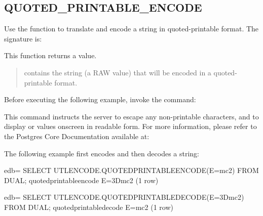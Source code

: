 \documentclass[letterpaper,10pt,english,openany,oneside]{sphinxmanual}
\begin{document}
\newpage


\subsection{QUOTED\_PRINTABLE\_ENCODE}
\label{\detokenize{quoted_printable_encode::doc}}\label{\detokenize{quoted_printable_encode:quoted-printable-encode}}
Use the  function to translate and encode a
string in quoted-printable format. The signature is:
\begin{quote}

\end{quote}

This function returns a  value.


\begin{quote}

 contains the string (a RAW value) that will be encoded in a
quoted-printable format.
\end{quote}


Before executing the following example, invoke the command:
\begin{quote}

\end{quote}

This command instructs the server to escape any non-printable
characters, and to display  or  values onscreen in readable
form. For more information, please refer to the Postgres Core
Documentation available at:


The following example first encodes and then decodes a string:

%
\begin{sphinxVerbatim}[commandchars=\\\{\}]
edb=\PYGZsh{} SELECT UTL\PYGZus{}ENCODE.QUOTED\PYGZus{}PRINTABLE\PYGZus{}ENCODE(\PYGZsq{}E=mc2\PYGZsq{}) FROM DUAL;  quoted\PYGZus{}printable\PYGZus{}encode
\PYGZhy{}\PYGZhy{}\PYGZhy{}\PYGZhy{}\PYGZhy{}\PYGZhy{}\PYGZhy{}\PYGZhy{}\PYGZhy{}\PYGZhy{}\PYGZhy{}\PYGZhy{}\PYGZhy{}\PYGZhy{}\PYGZhy{}\PYGZhy{}\PYGZhy{}\PYGZhy{}\PYGZhy{}\PYGZhy{}\PYGZhy{}\PYGZhy{}\PYGZhy{}\PYGZhy{}\PYGZhy{}
 E=3Dmc2
(1 row)

edb=\PYGZsh{} SELECT UTL\PYGZus{}ENCODE.QUOTED\PYGZus{}PRINTABLE\PYGZus{}DECODE(\PYGZsq{}E=3Dmc2\PYGZsq{}) FROM DUAL;
 quoted\PYGZus{}printable\PYGZus{}decode
\PYGZhy{}\PYGZhy{}\PYGZhy{}\PYGZhy{}\PYGZhy{}\PYGZhy{}\PYGZhy{}\PYGZhy{}\PYGZhy{}\PYGZhy{}\PYGZhy{}\PYGZhy{}\PYGZhy{}\PYGZhy{}\PYGZhy{}\PYGZhy{}\PYGZhy{}\PYGZhy{}\PYGZhy{}\PYGZhy{}\PYGZhy{}\PYGZhy{}\PYGZhy{}\PYGZhy{}\PYGZhy{}
 E=mc2
(1 row)
\end{sphinxVerbatim}
\end{document}
